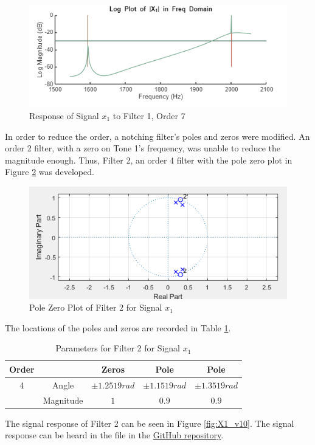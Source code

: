 \begin{figure}[H]
    \centering
    \includegraphics[width=0.5\linewidth]{figures/X1_filterv2.png}
    \caption{Response of Signal $x_1$ to Filter 1, Order 7}
    \label{fig:X1_v2}
\end{figure}

In order to reduce the order, a notching filter's poles and zeros were modified.  An order 2 filter, with a zero on Tone 1's frequency, was unable to reduce the magnitude enough.  Thus, Filter 2, an order 4 filter with the pole zero plot in Figure \ref{fig:x1_v10_polezero} was developed.

\begin{figure}[H]
    \centering
    \includegraphics[width=0.5\linewidth]{figures/x1_v10_polezero.png}
    \caption{Pole Zero Plot of Filter 2 for Signal $x_1$}
    \label{fig:x1_v10_polezero}
\end{figure}

The locations of the poles and zeros are recorded in Table \ref{tab:x1_v10}.

\begin{table}[H]
    \centering
    \begin{tabular}{c|cccc}
         Order & & Zeros & Pole & Pole \\ \hline
         4 & Angle & $\pm 1.2519 \unit{rad}$  & $\pm 1.1519 \unit{rad}$ & $\pm 1.3519 \unit{rad}$ \\
         & Magnitude & $1$ & $0.9$ & $0.9$
    \end{tabular}
    \caption{Parameters for Filter 2 for Signal $x_1$}
    \label{tab:x1_v10}
\end{table}

The signal response of Filter 2 can be seen in Figure \ref{fig:X1_v10}.  The signal response can be heard in the  file in the \href{https://github.com/dbcometto/ece434_cpx2}{GitHub repository}.

